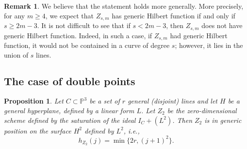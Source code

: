 \documentclass[12pt]{amsart}%
\numberwithin{equation}{section}
\newtheorem{proposition}[theorem]{Proposition}
\theoremstyle{definition}
\newtheorem{remark}[theorem]{Remark}
\numberwithin{equation}{section}
\newcommand{\PP}{ \ensuremath{\mathbb{P}}}
\begin{document}
\begin{remark}
    We believe that the statement holds more generally. More precisely, for any $m\geq 4$, we expect that $Z_{s,m}$ has generic Hilbert function if and only if $s\geq 2m-3$.\newline
    It is not difficult to see that if $s<2m-3$, then $Z_{s,m}$ does not have generic Hilbert function. Indeed, in such a case, if $Z_{s,m}$ had generic Hilbert function, it would not be contained in a curve of degree $s$; however, it lies in the union of $s$ lines.
\end{remark}





\subsection{The case of double points}

\begin{proposition} \label{Z2}
Let $C \subset \PP^3$ be a set of $r$ general (disjoint) lines and let $H$ be a general hyperplane, defined by a linear form $L$. Let $Z_2$ be the zero-dimensional scheme defined by the saturation of the ideal $I_C + (L^2)$. Then $Z_2$ is in generic position on the surface $H^2$ defined by $L^2$, {i.e., 
\[
h_{Z_2} (j) = \min \{ 2r, (j+1)^2\}. 
\]
}
\end{proposition}
\end{document}

